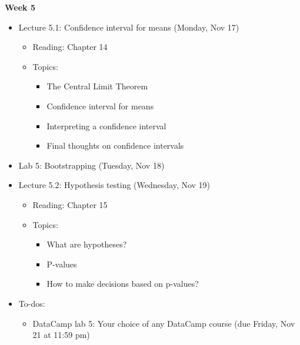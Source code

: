 \documentclass[11pt]{article}
\begin{document}
\large \textbf{Week 5}
\begin{itemize}
    \item Lecture 5.1: Confidence interval for means (Monday, Nov 17)
    \begin{itemize}
        \item Reading: Chapter 14
        \item Topics: 
        \begin{itemize}
            \item The Central Limit Theorem
            \item Confidence interval for means
            \item Interpreting a confidence interval
            \item Final thoughts on confidence intervals
        \end{itemize}
    \end{itemize}
    \item Lab 5: Bootstrapping (Tuesday, Nov 18)
    \item Lecture 5.2: Hypothesis testing (Wednesday, Nov 19)
    \begin{itemize}
        \item Reading: Chapter 15
        \item Topics:
        \begin{itemize}
            \item What are hypotheses?
            \item P-values
            \item How to make decisions based on p-values?
        \end{itemize}
    \end{itemize}
    \item To-dos:
    \begin{itemize}
        \item DataCamp lab 5: Your choice of any DataCamp course (due Friday, Nov 21 at 11:59 pm)
    \end{itemize}
\end{itemize}
\end{document}

